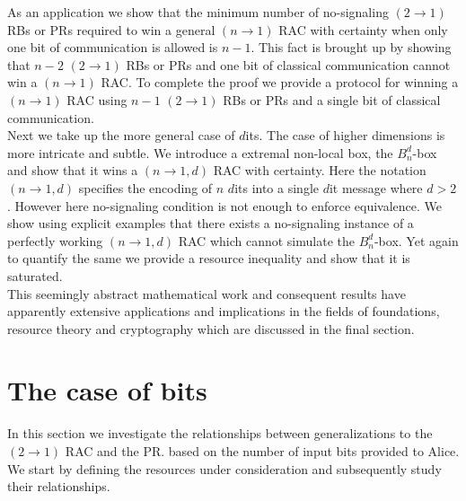 \documentclass[%
 reprint,
 amsmath,amssymb,
 aps,
]{revtex4-1}
\begin{document}
As an application we show that the minimum number of no-signaling $(2\rightarrow 1)$ RBs or PRs required to win a general $(n\rightarrow 1)$ RAC with certainty when only one bit of communication is allowed is $n-1$. This fact is brought up by showing that $n-2$  $(2\rightarrow 1)$ RBs or PRs and one bit of classical communication cannot win a $(n\rightarrow 1)$ RAC. To complete the proof we provide a protocol for winning a $(n\rightarrow 1)$ RAC using $n-1$ $(2\rightarrow 1)$ RBs or PRs  and a single bit of classical communication. \\
Next we take up the more general case of $d$its. The case of higher dimensions is more intricate and subtle. We introduce a extremal non-local box, the $B^d_n$-box and show that it wins a $(n\rightarrow 1,d)$ RAC with certainty. Here the notation $(n\rightarrow 1,d)$ specifies the encoding of $n$ $d$its into a single $d$it message where $d>2$.  However here no-signaling condition is not enough to enforce equivalence. We show using explicit examples that there exists a no-signaling instance of a perfectly working $(n\rightarrow 1,d)$ RAC which  cannot simulate the $B^d_n$-box. Yet again to quantify the same we provide a resource inequality and show that it is saturated. \\
This seemingly abstract mathematical work and consequent results have apparently extensive applications and implications in the fields of foundations, resource theory and cryptography which are discussed in the final section.



\section{\label{sec:level1}The case of bits}
In this section we investigate the relationships between generalizations to the $(2\rightarrow 1)$ RAC and the PR. based on the number of input bits provided to Alice. We start by defining the resources under consideration and subsequently study their relationships.
\end{document}
